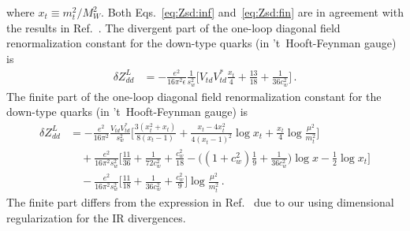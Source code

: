 \documentclass[letter,11pt,DIV=12,abstract=true,numbers=noenddot,titlepage=false,twocolumn=false,draft=false]{scrartcl}
\newcommand{\xt}{x_{t}}
\newcommand{\xtz}{x}
\newcommand{\mt}{m_t}
\begin{document}
where $x_t \equiv m_t^2/M_W^2$. Both Eqs.~\eqref{eq:Zsd:inf}
and~\eqref{eq:Zsd:fin} are in agreement with the results in
Ref.~\cite{Gambino:1998rt}.
%
The divergent part of the one-loop diagonal field renormalization
constant for the down-type quarks (in 't~Hooft-Feynman gauge) is
\begin{align}
  \delta Z_{dd}^L & = - \frac{e^2}{16\pi^2\epsilon} \frac{1}{s_w^2}
                     \bigg[
                        V_{td} V_{td}^* \frac{\xt}{4}
                      + \frac{13}{18}
                      + \frac{1}{36c_w^2}
                     \bigg]\,.
\end{align}
The finite part of the one-loop diagonal field renormalization
constant for the down-type quarks (in 't~Hooft-Feynman gauge) is
\begin{equation}
\begin{split}
  \delta Z_{dd}^L & = - \frac{e^2}{16\pi^2} \frac{V_{td} V_{td}^*}{s_w^2}
                     \bigg[   \frac{3(\xt^2 + \xt)}{8(\xt - 1)}
                            + \frac{\xt - 4\xt^2}{4(\xt - 1)^2} \log \xt
                            + \frac{\xt}{4} \log \frac{\mu^2}{\mt^2}
                     \bigg]\\
                 & \quad + \frac{e^2}{16\pi^2 s_w^2}
                     \bigg[   \frac{11}{36}
                            + \frac{1}{72c_w^2}
                            + \frac{c_w^2}{18}
                            - \bigg( (1+c_w^2) \frac{1}{9} + \frac{1}{36c_w^2} \bigg)
                              \log \xtz
                            - \frac{1}{2} \log \xt
                     \bigg]\\
                 & \quad - \frac{e^2}{16\pi^2 s_w^2}
                     \bigg[   \frac{11}{18}
                            + \frac{1}{36c_w^2}
                            + \frac{c_w^2}{9}
                     \bigg]
                     \log\frac{\mu^2}{m_t^2} \,.
\end{split}
\end{equation}
The finite part differs from the expression in
Ref.~\cite{Gambino:1998rt} due to our using dimensional regularization
for the IR divergences.


\end{document}
